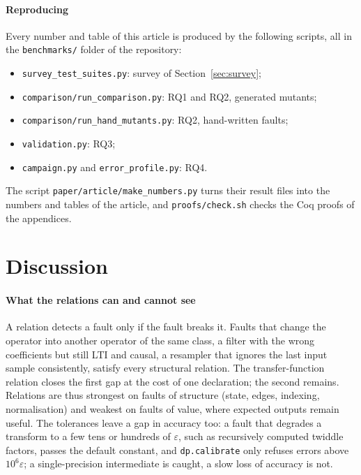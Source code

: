 \documentclass[10pt,conference]{IEEEtran}
\newcommand{\eps}{\varepsilon}
\newcommand{\code}[1]{\texttt{#1}}
\begin{document}
\paragraph*{Reproducing} Every number and table of this article is produced by
the following scripts, all in the \code{benchmarks/} folder of the repository:
\begin{itemize}
\item \code{survey\_test\_suites.py}: survey of Section~\ref{sec:survey};
\item \code{comparison/run\_comparison.py}: RQ1 and RQ2, generated mutants;
\item \code{comparison/run\_hand\_mutants.py}: RQ2, hand-written faults;
\item \code{validation.py}: RQ3;
\item \code{campaign.py} and \code{error\_profile.py}: RQ4.
\end{itemize}
The script \code{paper/article/make\_numbers.py} turns their result files into
the numbers and tables of the article, and \code{proofs/check.sh} checks the
Coq proofs of the appendices.

\section{Discussion}
\label{sec:discussion}

\paragraph*{What the relations can and cannot see} A relation detects a fault
only if the fault breaks it. Faults that change the operator into another
operator of the same class, a filter with the wrong coefficients but still LTI
and causal, a resampler that ignores the last input sample consistently,
satisfy every structural relation. The transfer-function relation closes the
first gap at the cost of one declaration; the second remains. Relations are
thus strongest on faults of structure (state, edges, indexing, normalisation)
and weakest on faults of value, where expected outputs remain useful. The
tolerances leave a gap in accuracy too: a fault that degrades a transform to a
few tens or hundreds of $\eps$, such as recursively computed twiddle factors,
passes the default constant, and \code{dp.calibrate} only refuses errors above
$10^6\eps$; a single-precision intermediate is caught, a slow loss of accuracy
is not.
\end{document}
